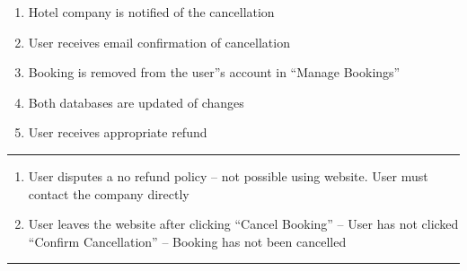 \begin{enumerate}
	\item Hotel company is notified of the cancellation
	\item User receives email confirmation of cancellation
	\item Booking is removed from the user''s account in ``Manage Bookings''
	\item Both databases are updated of changes
	\item User receives appropriate refund
\end{enumerate}
\noindent\rule{\textwidth}{0.6pt}

\begin{enumerate}
	\item User disputes a no refund policy – not possible using website. User
		must contact the company directly
	\item User leaves the website after clicking ``Cancel Booking'' – User has
		not clicked ``Confirm Cancellation'' – Booking has not been cancelled
\end{enumerate}
\noindent\rule{\textwidth}{0.6pt}

\restoregeometry